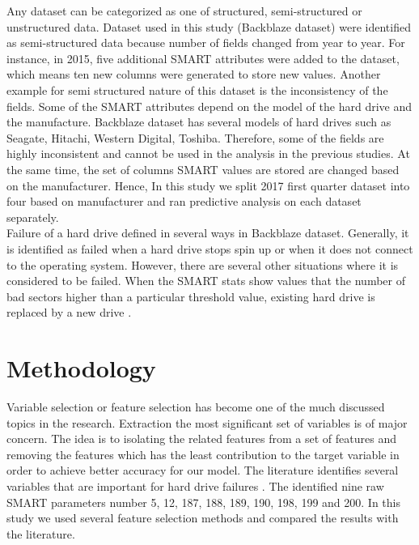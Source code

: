\documentclass[conference]{IEEEtran}
\begin{document}
Any dataset can be categorized as one of structured, semi-structured or unstructured data. Dataset used in this study (Backblaze dataset) were identified as semi-structured data because number of fields changed from year to year. For instance, in 2015, five additional SMART attributes were added to the dataset, which means ten new columns were generated to store new values. Another example for semi structured nature of this dataset is the inconsistency of the fields. Some of the SMART attributes depend on the model of the hard drive and the manufacture. Backblaze dataset has several models of hard drives such as Seagate, Hitachi, Western Digital, Toshiba. Therefore, some of the fields are highly inconsistent and cannot be used in the analysis in the previous studies\cite{b15}. At the same time, the set of columns SMART values are stored are changed based on the manufacturer. Hence, In this study we split 2017 first quarter dataset into four based on manufacturer and ran predictive analysis on each dataset separately.\\

Failure of a hard drive defined in several ways in Backblaze dataset. Generally, it is identified as failed when a hard drive stops spin up or when it does not connect to the operating system. However, there are several other situations where it is considered to be failed. When the SMART stats show values that the number of bad sectors higher than a particular threshold value, existing hard drive is replaced by a new drive \cite{b7}.

\section{Methodology}

Variable selection or feature selection has become one of the much discussed topics in the research. Extraction the most significant set of variables is of major concern. The idea is to isolating the related features from a set of features and removing the features which has the least contribution to the target variable in order to achieve better accuracy for our model. The literature identifies several variables that are important for hard drive failures \cite{b17}. The identified nine raw SMART parameters number 5, 12, 187, 188, 189, 190, 198, 199 and 200. In this study we used several feature selection methods and compared the results with the literature.\\
\end{document}
